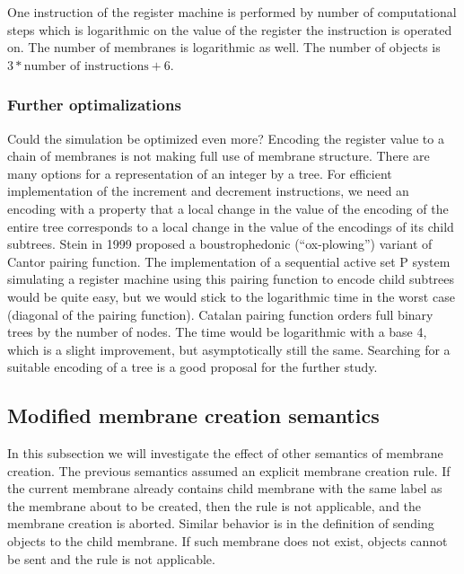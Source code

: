     One instruction of the register machine is performed by number of computational steps which is logarithmic on the value of the register the instruction is operated on. The number of membranes is logarithmic as well. The number of objects is $3 * \text{number of instructions} + 6$.

  \subsubsection{Further optimalizations} %
  \label{ssub:further_optimalizations}
    Could the simulation be optimized even more? Encoding the register value to a chain of membranes is not making full use of membrane structure. There are many options for a representation of an integer by a tree. For efficient implementation of the increment and decrement instructions, we need an encoding with a property that a local change in the value of the encoding of the entire tree corresponds to a local change in the value of the encodings of its child subtrees. Stein in 1999 \cite{Stein99Plowing} proposed a boustrophedonic (``ox-plowing'') variant of Cantor pairing function. The implementation of a sequential active set P system simulating a register machine using this pairing function to encode child subtrees would be quite easy, but we would stick to the logarithmic time in the worst case (diagonal of the pairing function).
    Catalan pairing function \cite{Stanley1986EnumerativeCombinatorics} orders full binary trees by the number of nodes. The time would be logarithmic with a base 4, which is a slight improvement, but asymptotically still the same.
    Searching for a suitable encoding of a tree is a good proposal for the further study.


\subsection{Modified membrane creation semantics} %
\label{sub:modified_membrane_creation_semantics}
  
  In this subsection we will investigate the effect of other semantics of membrane creation. The previous semantics assumed an explicit membrane creation rule. If the current membrane already contains child membrane with the same label as the membrane about to be created, then the rule is not applicable, and the membrane creation is aborted. Similar behavior is in the definition of sending objects to the child membrane. If such membrane does not exist, objects cannot be sent and the rule is not applicable.

